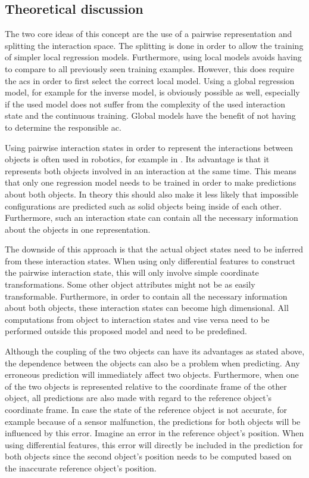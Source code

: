 \subsection{Theoretical discussion \label{sec:interactionTheory}}
The two core ideas of this concept are the use of a pairwise representation and splitting the interaction space. The splitting is done in order to allow the training of simpler local regression models. Furthermore, using local models avoids having to compare to all previously seen training examples. However, this does require the \acrlong{acs} in order to first select the correct local model.
Using a global regression model, for example for the inverse model, is obviously possible as well, especially if the used model does not suffer from the complexity of the used interaction state and the continuous training. Global models have the benefit of not having to determine the responsible \acrlong{ac}.

Using pairwise interaction states in order to represent the interactions between objects is often used in robotics, for example in \cite{moldovan2012learning,pairwise2}. 
Its advantage is that it represents both objects involved in an interaction at the same time. This means that only one regression model needs to be trained in order to make predictions about both objects. In theory this should also make it less likely that impossible configurations are predicted such as solid objects being inside of each other. Furthermore, such an interaction state can contain all the necessary information about the objects in one representation. 

The downside of this approach is that the actual object states need to be inferred from these interaction states. When using only differential features to construct the pairwise interaction state, this will only involve simple coordinate transformations. Some other object attributes might not be as easily transformable. Furthermore, in order to contain all the necessary information about both objects, these interaction states can become high dimensional. All computations from object to interaction states and vise versa need to be performed outside this proposed model and need to be predefined.

Although the coupling of the two objects can have its advantages as stated above, the dependence between the objects can also be a problem when predicting. Any erroneous prediction will immediately affect two objects. 
Furthermore, when one of the two objects is represented relative to the coordinate frame of the other object, all predictions are also made with regard to the reference object's coordinate frame. 
In case the state of the reference object is not accurate, for example because of a sensor malfunction, the predictions for both objects will be influenced by this error. Imagine an error in the reference object's position. When using differential features, this error will directly be included in the prediction for both objects since the second object's position needs to be computed based on the inaccurate reference object's position.

